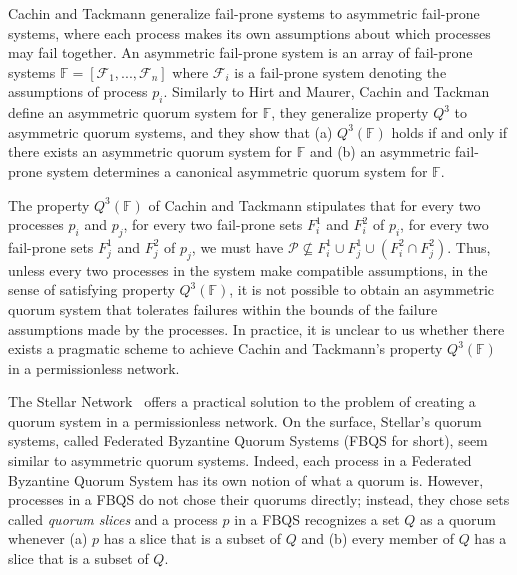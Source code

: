\documentclass[11pt]{article}
\begin{document}
Cachin and Tackmann generalize fail-prone systems to asymmetric fail-prone systems, where each process makes its own assumptions about which processes may fail together.
An asymmetric fail-prone system is an array of fail-prone systems $\mathbb{F}=\left[\mathcal{F}_1,...,\mathcal{F}_n\right]$ where $\mathcal{F}_i$ is a fail-prone system denoting the assumptions of process $p_i$.  Similarly to Hirt and Maurer, Cachin and Tackman define an asymmetric quorum system for $\mathbb{F}$, they generalize property $Q^3$ to asymmetric quorum systems, and they show that (a) $Q^3(\mathbb{F})$ holds if and only if there exists an asymmetric quorum system for $\mathbb{F}$ and (b) an asymmetric fail-prone system determines a canonical asymmetric quorum system for $\mathbb{F}$.


The property $Q^3(\mathbb{F})$ of Cachin and Tackmann stipulates that for every two processes $p_i$ and $p_j$, for every two fail-prone sets $F_i^1$ and $F_i^2$ of $p_i$, for every two fail-prone sets $F_j^1$ and $F_j^2$ of $p_j$, we must have $\mathcal{P}\not\subseteq F_i^1\cup F_j^1\cup \left(F_i^2\cap F_j^2\right)$. Thus, unless every two processes in the system make compatible assumptions, in the sense of satisfying property $Q^3(\mathbb{F})$, it is not possible to obtain an asymmetric quorum system that tolerates failures within the bounds of the failure assumptions made by the processes. In practice, it is unclear to us whether there exists a pragmatic scheme to achieve Cachin and Tackmann's property $Q^3(\mathbb{F})$ in a permissionless network.


The Stellar Network~\cite{MazieresStellarConsensusProtocol2015,lokhavaFastSecureGlobal2019} offers a practical solution to the problem of creating a quorum system in a permissionless network. On the surface, Stellar's quorum systems, called Federated Byzantine Quorum Systems (FBQS for short), seem similar to asymmetric quorum systems. Indeed, each process in a Federated Byzantine Quorum System has its own notion of what a quorum is. However, processes in a FBQS do not chose their quorums directly; instead, they chose sets called \emph{quorum slices} and a process $p$ in a FBQS recognizes a set $Q$ as a quorum whenever (a) $p$ has a slice that is a subset of $Q$ and (b) every member of $Q$ has a slice that is a subset of $Q$.
\end{document}
